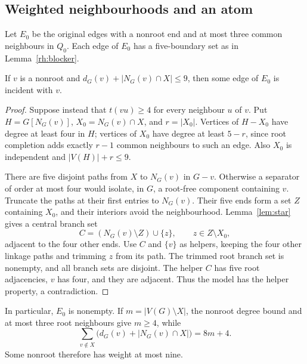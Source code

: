 \subsection{Weighted neighbourhoods and an atom}

Let $E_0$ be the original edges with a nonroot end and at most three
common neighbours in $Q_0$. Each edge of $E_0$ has a five-boundary
set as in Lemma~\ref{rh:blocker}.

\begin{lemma}\label{rh:weighted}
If $v$ is a nonroot and $d_G(v)+|N_G(v)\cap X|\le9$, then some edge
of $E_0$ is incident with $v$.
\end{lemma}

\begin{proof}
Suppose instead that $t(vu)\ge4$ for every neighbour $u$ of $v$.
Put $H=G[N_G(v)]$, $X_0=N_G(v)\cap X$, and $r=|X_0|$. Vertices of
$H-X_0$ have degree at least four in $H$; vertices of $X_0$ have degree
at least $5-r$, since root completion adds exactly $r-1$ common
neighbours to such an edge. Also $X_0$ is independent and
$|V(H)|+r\le9$.

There are five disjoint paths from $X$ to $N_G(v)$ in $G-v$.
Otherwise a separator of order at most four would isolate, in $G$,
a root-free component containing $v$. Truncate the paths at their first
entries to $N_G(v)$. Their five ends form a set $Z$ containing $X_0$,
and their interiors avoid the neighbourhood. Lemma~\ref{lem:star}
gives a central branch set
\[
 C=(N_G(v)\setminus Z)\cup\{z\},\qquad z\in Z\setminus X_0,
\]
adjacent to the four other ends. Use $C$ and $\{v\}$ as helpers,
keeping the four other linkage paths and trimming $z$ from its path.
The trimmed root branch set is nonempty, and all branch sets are
disjoint. The helper $C$ has five root adjacencies, $v$ has four, and
they are adjacent. Thus the model has the helper property, a contradiction.
\end{proof}

In particular, $E_0$ is nonempty. If $m=|V(G)\setminus X|$, the
nonroot degree bound and at most three root neighbours give $m\ge4$,
while
\begin{equation}\label{rh:total-weight}
 \sum_{v\notin X}\bigl(d_G(v)+|N_G(v)\cap X|\bigr)=8m+4.
\end{equation}
Some nonroot therefore has weight at most nine.

